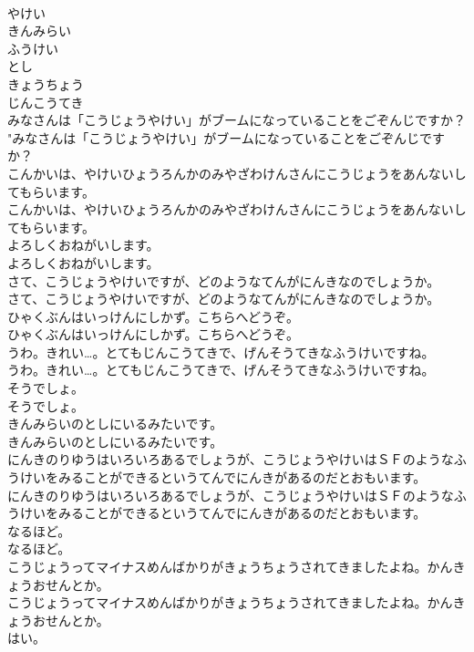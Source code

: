 \documentclass[8pt]{extreport}
\begin{document}
\begin{CJK}{UTF8}{min}
\\	やけい
\\	きんみらい
\\	ふうけい
\\	とし
\\	きょうちょう
\\	じんこうてき
\\	みなさんは「こうじょうやけい」がブームになっていることをごぞんじですか？	
\\	"みなさんは「こうじょうやけい」がブームになっていることをごぞんじですか？ 
\\	こんかいは、やけいひょうろんかのみやざわけんさんにこうじょうをあんないしてもらいます。	
\\	こんかいは、やけいひょうろんかのみやざわけんさんにこうじょうをあんないしてもらいます。 
\\	よろしくおねがいします。	
\\	よろしくおねがいします。 
\\	さて、こうじょうやけいですが、どのようなてんがにんきなのでしょうか。	
\\	さて、こうじょうやけいですが、どのようなてんがにんきなのでしょうか。 
\\	ひゃくぶんはいっけんにしかず。こちらへどうぞ。	
\\	ひゃくぶんはいっけんにしかず。こちらへどうぞ。 
\\	うわ。きれい…。とてもじんこうてきで、げんそうてきなふうけいですね。	
\\	うわ。きれい…。とてもじんこうてきで、げんそうてきなふうけいですね。 
\\	そうでしょ。	
\\	そうでしょ。 
\\	きんみらいのとしにいるみたいです。	
\\	きんみらいのとしにいるみたいです。 
\\	にんきのりゆうはいろいろあるでしょうが、こうじょうやけいはＳＦのようなふうけいをみることができるというてんでにんきがあるのだとおもいます。	
\\	にんきのりゆうはいろいろあるでしょうが、こうじょうやけいはＳＦのようなふうけいをみることができるというてんでにんきがあるのだとおもいます。 
\\	なるほど。	
\\	なるほど。 
\\	こうじょうってマイナスめんばかりがきょうちょうされてきましたよね。かんきょうおせんとか。	
\\	こうじょうってマイナスめんばかりがきょうちょうされてきましたよね。かんきょうおせんとか。 
\\	はい。	

\end{CJK}
\end{document}
